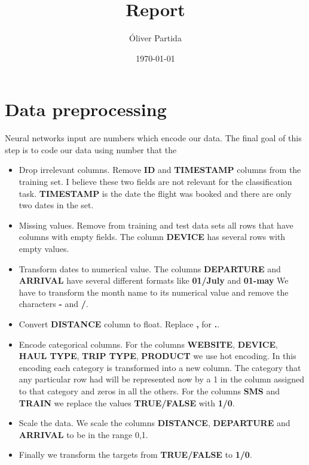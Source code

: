 \documentclass[11pt,amsmath,amssymb]{article}
\begin{document}
\title{Report}
\author{Óliver Partida}
\date{\today}
\maketitle

\section{Data preprocessing}
Neural networks input are numbers which encode our data. The final goal of this step is to code our data using number that the  
\begin{itemize}
\item Drop irrelevant columns. Remove \textbf{ID} and \textbf{TIMESTAMP} columns from the training set. I believe these two fields are not relevant for the classification task. \textbf{TIMESTAMP} is the date the flight was booked and there are only two dates in the set.
\item Missing values. Remove from training and test data sets all rows that have columns with empty fields. The column \textbf{DEVICE} has several rows with empty values.
\item Transform dates to numerical value. The columns \textbf{DEPARTURE} and \textbf{ARRIVAL} have several different formats like \textbf{01/July} and \textbf{01-may} We have to transform the month name to its numerical value and remove the characters \textbf{-} and \textbf{/}.
\item Convert \textbf{DISTANCE} column to float. Replace \textbf{,} for \textbf{.}.

\item Encode categorical columns. For the columns \textbf{WEBSITE}, \textbf{DEVICE}, \textbf{HAUL TYPE}, \textbf{TRIP TYPE}, \textbf{PRODUCT} we use hot encoding. In this encoding each category is transformed into a new column. The category that any particular row had will be represented now by a 1 in the column assigned to that category and zeros in all the others. For the columns \textbf{SMS} and \textbf{TRAIN} we replace the values \textbf{TRUE/FALSE} with \textbf{1/0}.

\item Scale the data. We scale the columns \textbf{DISTANCE}, \textbf{DEPARTURE} and \textbf{ARRIVAL} to be in the range 0,1.  

\item Finally we transform the targets from \textbf{TRUE/FALSE} to \textbf{1/0}.
\end{itemize}
\end{document}
